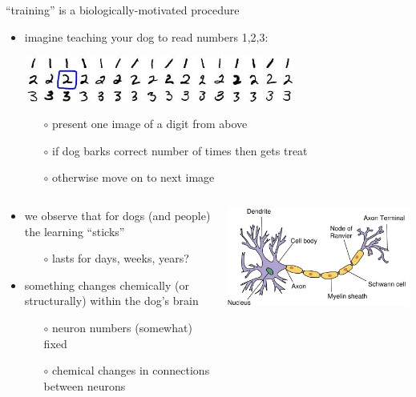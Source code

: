 \documentclass[xcolor={svgnames},
               hyperref={colorlinks,citecolor=DeepPink4,linkcolor=FireBrick,urlcolor=Maroon}]
               {beamer}
\begin{document}
\begin{frame}{``training'' is a biologically-motivated procedure}

\begin{itemize}
\item imagine teaching your dog to read numbers 1,2,3:
\begin{center}
\includegraphics[width=0.7\textwidth]{figs/onetwothree}
\end{center}
    \begin{itemize}
    \item[$\circ$] present one image of a digit from above
    \item[$\circ$] if dog barks correct number of times then gets treat
    \item[$\circ$] otherwise move on to next image
    \end{itemize}
\end{itemize}

\begin{columns}
\begin{column}{0.6\textwidth}
\begin{itemize}
\item we observe that for dogs (and people) the learning ``sticks''
    \begin{itemize}
    \item[$\circ$] lasts for days, weeks, years?
    \end{itemize}
\item something changes chemically (or structurally) within the dog's brain
    \begin{itemize}
    \item[$\circ$] neuron numbers (somewhat) fixed
    \item[$\circ$] chemical changes in connections between neurons
    \end{itemize}
\end{itemize}
\end{column}
\begin{column}{0.4\textwidth}
\includegraphics[width=\textwidth]{figs/physicalneuron}
\end{column}
\end{columns}
\end{frame}
\end{document}
